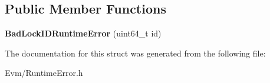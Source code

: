\subsection*{Public Member Functions}
\begin{DoxyCompactItemize}
\item 
\mbox{\label{struct_evm_1_1_bad_lock_i_d_runtime_error_a5422087bc433fb211d48b3d827a32e89}} 
{\bfseries Bad\+Lock\+I\+D\+Runtime\+Error} (uint64\+\_\+t id)
\end{DoxyCompactItemize}


The documentation for this struct was generated from the following file\+:\begin{DoxyCompactItemize}
\item 
Evm/Runtime\+Error.\+h\end{DoxyCompactItemize}
